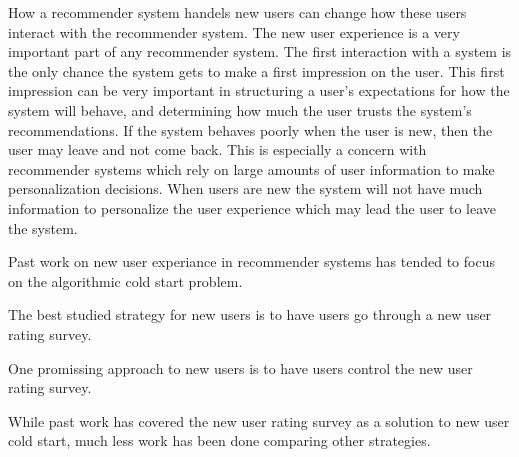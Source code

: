 \documentclass[letterpaper]{sig-alternate}
\begin{document}
  

  How a recommender system handels new users can change how these users interact with the recommender system.
  The new user experience is a very important part of any recommender system.
  The first interaction with a system is the only chance the system gets to make a first impression on the user.
  This first impression can be very important in structuring a user's expectations for how the system will behave, and determining how much the user trusts the system's recommendations.
  If the system behaves poorly when the user is new, then the user may leave and not come back.
  This is especially a concern with recommender systems which rely on large amounts of user information to make personalization decisions.
  When users are new the system will not have much information to personalize the user experience which may lead the user to leave the system.

  Past work on new user experiance in recommender systems has tended to focus on the algorithmic cold start problem.


  The best studied strategy for new users is to have users go through a new user rating survey.

  One promissing approach to new users is to have users control the new user rating survey.

  While past work has covered the new user rating survey as a solution to new user cold start, much less work has been done comparing other strategies.
\end{document}
